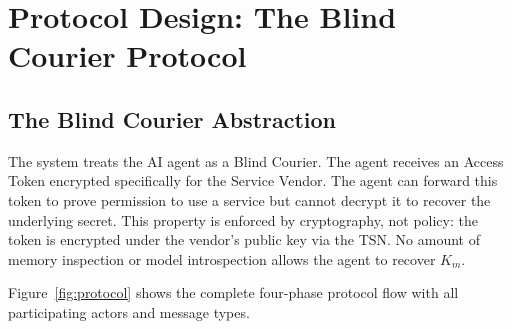 \documentclass[conference]{IEEEtran}
\begin{document}
\section{Protocol Design: The Blind Courier Protocol}
\label{sec:protocol}

\subsection{The Blind Courier Abstraction}
The system treats the AI agent as a Blind Courier. The agent receives an Access Token
encrypted specifically for the Service Vendor. The agent can forward this token to
prove permission to use a service but cannot decrypt it to recover the underlying
secret. This property is enforced by cryptography, not policy: the token is encrypted
under the vendor's public key via the TSN. No amount of memory inspection or model
introspection allows the agent to recover $K_m$.

Figure~\ref{fig:protocol} shows the complete four-phase protocol flow with all
participating actors and message types.
\end{document}

